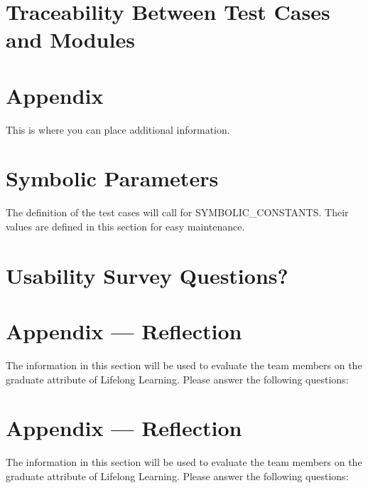 \documentclass[12pt, titlepage]{article}
\begin{document}
\section{Traceability Between Test Cases and Modules}

				




\newpage

\section{Appendix}

This is where you can place additional information.

\section{Symbolic Parameters}

The definition of the test cases will call for SYMBOLIC\_CONSTANTS.
Their values are defined in this section for easy maintenance.

\section{Usability Survey Questions?}


\newpage{}
\section*{Appendix --- Reflection}

The information in this section will be used to evaluate the team members on the
graduate attribute of Lifelong Learning.  Please answer the following questions:

\newpage{}
\section*{Appendix --- Reflection}


The information in this section will be used to evaluate the team members on the
graduate attribute of Lifelong Learning.  Please answer the following questions:
\end{document}
